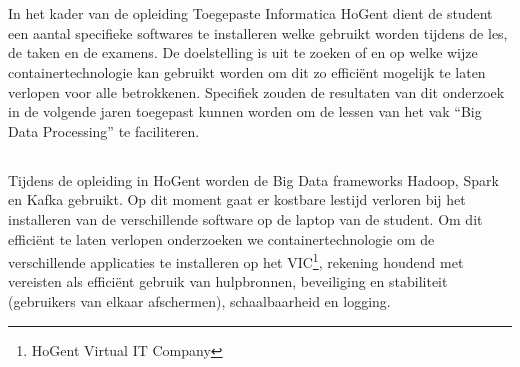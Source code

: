 
\chapter{}%
\label{ch:inleiding}

In het kader van de opleiding Toegepaste Informatica HoGent dient de student een aantal specifieke softwares te installeren welke gebruikt worden tijdens de les, de taken en de examens.
De doelstelling is uit te zoeken of en op welke wijze containertechnologie kan gebruikt worden om dit zo efficiënt mogelijk te laten verlopen voor alle betrokkenen. Specifiek zouden de resultaten van dit onderzoek in de volgende jaren toegepast kunnen worden om de lessen van het vak ``Big Data Processing'' te faciliteren.

\section{}%
\label{sec:probleemstelling}
Tijdens de opleiding in HoGent worden de Big Data frameworks Hadoop, Spark en Kafka gebruikt. Op dit moment gaat er kostbare lestijd verloren bij het installeren van de verschillende software op de laptop van de student. Om dit efficiënt te laten verlopen onderzoeken we containertechnologie om de verschillende applicaties te installeren op het VIC\footnote{HoGent Virtual IT Company}, rekening houdend met vereisten als efficiënt gebruik van hulpbronnen, beveiliging en stabiliteit (gebruikers van elkaar afschermen), schaalbaarheid en logging.

